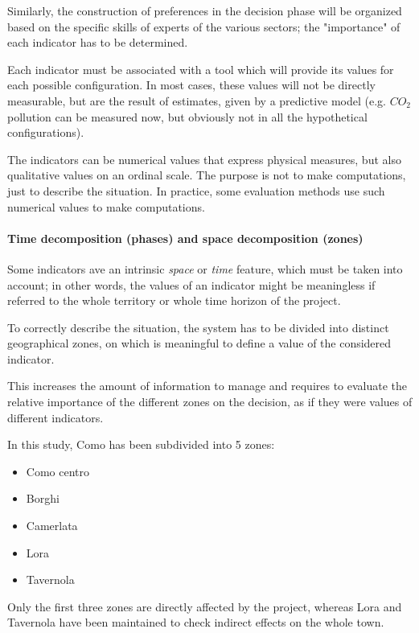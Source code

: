Similarly, the construction of preferences in the decision phase will be organized based on the specific skills of experts of the various sectors; the "importance" of each indicator has to be determined.

Each indicator must be associated with a tool which will provide its values for each possible configuration. In most cases, these values will not be directly measurable, but are the result of estimates, given by a predictive model (e.g. $CO_2$ pollution can be measured now, but obviously not in all the hypothetical configurations).

The indicators can be numerical values that express physical measures, but also qualitative values on an ordinal scale. The purpose is not to make computations, just to describe the situation. In practice, some evaluation methods use such numerical values to make computations.

\paragraph{Time decomposition (phases) and space decomposition (zones)} Some indicators ave an intrinsic \textit{space} or \textit{time} feature, which must be taken into account; in other words, the values of an indicator might be meaningless if referred to the whole territory or whole time horizon of the project.

To correctly describe the situation, the system has to be divided into distinct geographical zones, on which is meaningful to define a value of the considered indicator.

This increases the amount of information to manage and requires to evaluate the relative importance of the different zones on the decision, as if they were values of different indicators. 

In this study, Como has been subdivided into 5 zones: 
\begin{itemize}
	\item Como centro 
	
	\item Borghi
	
	\item Camerlata
	
	\item Lora 
	
	\item Tavernola
\end{itemize}

Only the first three zones are directly affected by the project, whereas Lora and Tavernola have been maintained to check indirect effects on the whole town.

